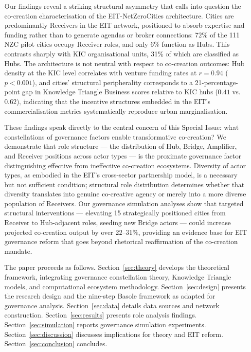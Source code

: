 \documentclass[review,12pt]{elsarticle}
\begin{document}
Our findings reveal a striking structural asymmetry that calls into question the co-creation characterisation of the EIT-NetZeroCities architecture. Cities are predominantly Receivers in the EIT network, positioned to absorb expertise and funding rather than to generate agendas or broker connections: 72\% of the 111 NZC pilot cities occupy Receiver roles, and only 6\% function as Hubs. This contrasts sharply with KIC organisational units, 31\% of which are classified as Hubs. The architecture is not neutral with respect to co-creation outcomes: Hub density at the KIC level correlates with venture funding rates at $r = 0.94$ ($p < 0.001$), and cities' structural peripherality corresponds to a 21-percentage-point gap in Knowledge Triangle Business scores relative to KIC hubs ($0.41$ vs.\ $0.62$), indicating that the incentive structures embedded in the EIT's commercialisation metrics systematically reproduce urban marginalisation.

These findings speak directly to the central concern of this Special Issue: what constellations of governance factors enable transformative co-creation? We demonstrate that role structure --- the distribution of Hub, Bridge, Amplifier, and Receiver positions across actor types --- is the proximate governance factor distinguishing effective from ineffective co-creation ecosystems. Diversity of actor types, as embodied in the EIT's cross-sector partnership model, is a necessary but not sufficient condition; structural role distribution determines whether that diversity translates into genuine co-creative agency or merely into a more diverse population of Receivers. Our governance simulation analyses show that targeted structural interventions --- elevating 15 strategically positioned cities from Receiver to Hub-adjacent roles, seeding new Bridge actors --- could increase projected co-creation output by over 22--31\%, providing an evidence base for EIT governance reform that goes beyond rhetorical reaffirmation of the co-creation mandate.

The paper proceeds as follows. Section~\ref{sec:theory} develops the theoretical framework, integrating governance constellation theory, Knowledge Triangle models, and computational ecosystem methodology. Section~\ref{sec:design} presents the research design and the nine-step Basole framework as adapted for governance analysis. Section~\ref{sec:data} details data sources and network construction. Section~\ref{sec:results} presents role analysis findings. Section~\ref{sec:simulation} reports governance simulation experiments. Section~\ref{sec:discussion} discusses implications for theory and EIT reform. Section~\ref{sec:conclusion} concludes.
\end{document}
